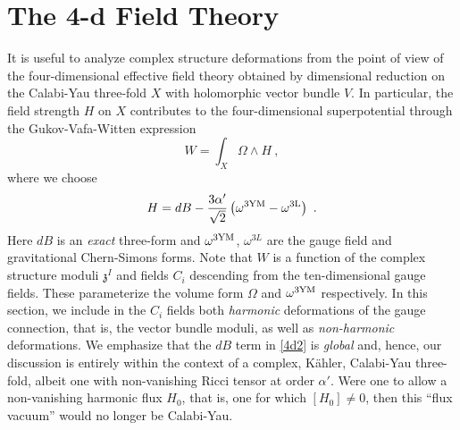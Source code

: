 \documentclass[12pt]{article}
\numberwithin{equation}{section}
\begin{document}
\section{The 4-d Field Theory}

It is useful to analyze complex structure deformations from the point of view of the four-dimensional effective field theory obtained by dimensional reduction on the Calabi-Yau three-fold $X$ with holomorphic vector bundle $V$. In particular, the field strength $H$ on $X$ contributes to the four-dimensional superpotential through the Gukov-Vafa-Witten expression \cite{Gukov:1999ya}
%
\begin{equation} 
 W = \int_X \Omega \wedge H \ ,
\label{4d1}
\end{equation}
%
where we choose
%
\begin{equation}
H = dB - \frac{3 \alpha'}{\sqrt{2}} \left( \omega^{3 \textnormal{YM}} - \omega^{3 {\textnormal L} }\right) \ .
\label{4d2}
\end{equation}
%
Here $dB$ is an {\it exact} three-form and $\omega^{3
  \textnormal{YM}}$, $\omega^{3L}$ are the gauge field and
gravitational Chern-Simons forms.  Note that $W$ is a function of the
complex structure moduli ${\mathfrak{z}}^{I}$ and fields $C_i$ descending
from the ten-dimensional gauge fields. These
parameterize the volume form $\Omega$ and $\omega^{3 \textnormal{YM}}$
respectively. In this section, we include in the $C_{i}$ fields both {\it harmonic} deformations of the gauge connection, that is, the vector bundle moduli, as well as {\it non-harmonic} deformations. We emphasize that the $dB$ term in \eqref{4d2} is {\it
  global} and, hence, our discussion is entirely within the context of
a complex, K\"ahler, Calabi-Yau three-fold, albeit one with
non-vanishing Ricci tensor at order $\alpha'$. Were one to allow a
non-vanishing harmonic flux $H_{0}$, that is, one for which $[H_{0}]
\neq 0$, then this ``flux vacuum'' would no longer be Calabi-Yau.
\end{document}
